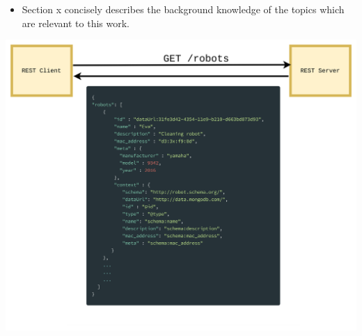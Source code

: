 		\begin{itemize}
			\item Section x concisely describes the background knowledge of the topics which are relevant to this work.
		\end{itemize}
\includegraphics[scale=0.08]{image}

\let\cleardoublepage\clearpage

